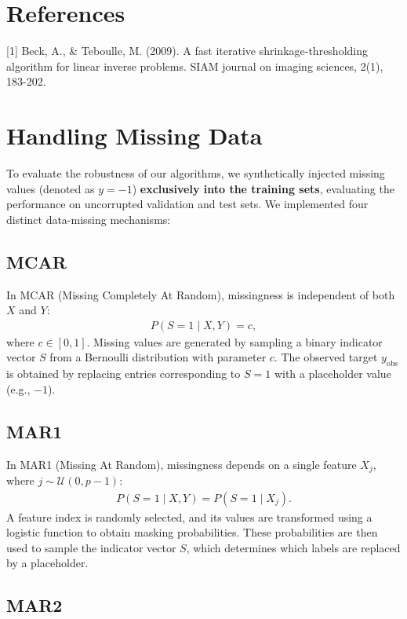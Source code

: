 \documentclass[12pt,a4paper]{article}
\begin{document}
\section{References}
[1] Beck, A., \& Teboulle, M. (2009). A fast iterative shrinkage-thresholding algorithm for linear inverse problems. SIAM journal on imaging sciences, 2(1), 183-202.



\newpage
\appendix

\section{Handling Missing Data}

To evaluate the robustness of our algorithms, we synthetically injected missing values (denoted as $y = -1$) \textbf{exclusively into the training sets}, evaluating the performance on uncorrupted validation and test sets. We implemented four distinct data-missing mechanisms:

\subsection{MCAR}

In MCAR (Missing Completely At Random), missingness is independent of both $X$ and $Y$:
\begin{align*}
    P(S = 1 \mid X, Y) = c,
\end{align*}
where $c \in [0,1]$. Missing values are generated by sampling a binary indicator vector $S$ from a Bernoulli distribution with parameter $c$. The observed target $y_{\text{obs}}$ is obtained by replacing entries corresponding to $S=1$ with a placeholder value (e.g., $-1$).

\subsection{MAR1}

In MAR1 (Missing At Random), missingness depends on a single feature $X_j$, where $j \sim \mathcal{U}(0, p-1)$:
\begin{align*}
    P(S = 1 \mid X, Y) = P(S = 1 \mid X_j).
\end{align*}
A feature index is randomly selected, and its values are transformed using a logistic function to obtain masking probabilities. These probabilities are then used to sample the indicator vector $S$, which determines which labels are replaced by a placeholder.

\subsection{MAR2}
\end{document}
